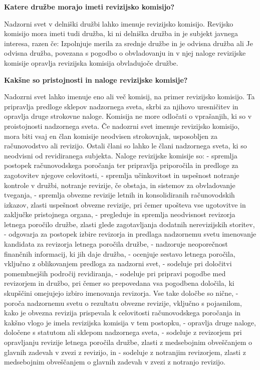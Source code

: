 \documentclass[a4paper,12pt,openright]{book}
\begin{document}
\textbf{Katere družbe morajo imeti revizijsko komisijo?}

Nadzorni svet v delniški družbi lahko imenuje revizijsko komisijo.
Revijsko komisijo mora imeti tudi družba, ki ni delniška družba in je subjekt javnega interesa, razen če:
Izpolnjuje merila za srednje družbe in je odvisna družba ali
Je odvisna družba, povezana s pogodbo o obvladovanju in v njej naloge revizijske komisije opravlja revizijska komisija obvladujoče družbe.

\textbf{Kakšne so pristojnosti in naloge revizijske komisije?}

Nadozrni svet lahko imenuje eno ali več komisij, na primer revizijsko komisijo. Ta pripravlja predloge sklepov nadzornega sveta, skrbi za njihovo uresničitev in opravlja druge strokovne naloge. Komisija ne more odločati o vprašanjih, ki so v proistojnosti nadzornega sveta.
Če nadozrni svet imenuje revizijsko komisijo, mora biti vsaj en član komisije neodvisen strokovnjak, usposobljen za računovodstvo ali revizijo. Ostali člani so lahko le člani nadzornega sveta, ki so neodvisni od revidiranega subjekta.
Naloge revizijske komisije so:
- spremlja postopek računovodskega poročanja ter pripravlja priporočila in predloge za zagotovitev njegove celovitosti,
- spremlja učinkovitost in uspešnost notranje kontrole v družbi, notranje revizije, če obstaja, in sistemov za obvladovanje tveganja,
- spremlja obvezne revizije letnih in konsolidiranih računovodskih izkazov, zlasti uspešnost obvezne revizije, pri čemer upošteva vse ugotovitve in zaključke pristojnega organa,
- pregleduje in spremlja neodvisnost revizorja letnega poročilo družbe, zlasti glede zagotavljanja dodatnih nerevizijskih storitev,
- odgovarja za postopek izbire revizorja in predlaga nadzornemu svetu imenovanje kandidata za revizorja letnega poročila družbe,
- nadzoruje neoporečnost finančnih informacij, ki jih daje družba,
- ocenjuje sestavo letnega poročila, vključno z oblikovanjem predloga za nadzorni svet,
- sodeluje pri določitvi pomembnejših področij revidiranja,
- sodeluje pri pripravi pogodbe med revizorjem in družbo, pri čemer so prepovedana vsa pogodbena določila, ki skupščini omejujejo izbiro imenovanja revizorja. Vse take določbe so nične,
- poroča nadzornemu svetu o rezultatu obvezne revizije, vključno s pojasnilom, kako je obvezna revizija prispevala k celovitosti računovodskega poročanja in kakšno vlogo je imela revizijska komisija v tem postopku,
- opravlja druge naloge, določene s statutom ali sklepom nadzornega sveta,
- sodeluje z revizorjem pri opravljanju revizije letnega poročila družbe, zlasti z medsebojnim obveščanjem o glavnih zadevah v zvezi z revizijo, in
- sodeluje z notranjim revizorjem, zlasti z medsebojnim obveščanjem o glavnih zadevah v zvezi z notranjo revizijo.
\end{document}
